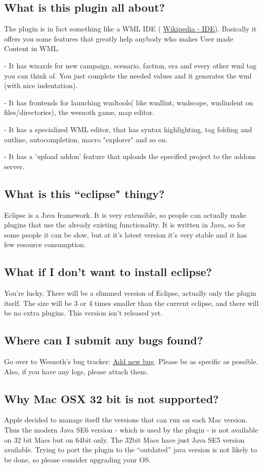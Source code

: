 \documentclass[10pt]{article}
\begin{document}
\subsection{What is this plugin all about?}
The plugin is in fact something like a WML IDE ( \href{http://en.wikipedia.org/wiki/Integrated_development_environment}{Wikipedia - IDE}). Basically it offers you some features that greatly help anybody who makes User made Content in WML.
\begin{description}
\item- It has wizards for new campaign, scenario, faction, era and every other wml tag you can think of. You just complete the needed values and it generates the wml (with nice indentation).
\item- It has frontends for launching wmltools( like wmllint, wmlscope, wmlindent on files/directories), the wesnoth game, map editor.
\item- It has a specialized WML editor, that has syntax highlighting, tag folding and outline, autocompletion, macro "explorer" and so on.
\item- It has a 'upload addon' feature that uploads the specified project to the addons server.
\end{description}

\subsection{What is this ``eclipse" thingy?}
Eclipse is a Java framework. It is very extensible, so people can actually make plugins that use the already existing functionality. It is written in Java, so for some people it can be slow, but at it's latest version it's very stable and it has few resource consumption.

\subsection{What if I don't want to install eclipse?}
You're lucky. There will be a slimmed version of Eclipse, actually only the plugin itself. The size will be 3 or 4 times smaller than the current eclipse, and there will be no extra plugins. This version isn't released yet.

\subsection{Where can I submit any bugs found?}
Go over to Wesnoth's bug tracker: \href{https://gna.org/bugs/?func=additem&group=wesnoth&bug_group_id=116}{Add new bug}. Please be as specific as possible. Also, if you have any logs, please attach them.

\subsection{Why Mac OSX 32 bit is not supported?}
Apple decided to manage itself the versions that can run on each Mac version. Thus the modern Java SE6 version - which is used by the plugin - is not available on 32 bit Macs but on 64bit only. The 32bit Macs have just Java SE5 version available. Trying to port the plugin to the ``outdated'' java version is not likely to be done, so please consider upgrading your OS.
\end{document}
